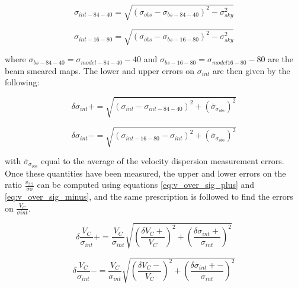 \documentclass[fleqn,usenatbib]{mn2e}
\begin{document}
\begin{equation}\label{eq:sig_84_40}
   \sigma_{int-84-40} = \sqrt{(\sigma_{obs} - \sigma_{bs-84-40})^{2} - \sigma_{sky}^{2}}
\end{equation}

\begin{equation}\label{eq:sig_16_80}
   \sigma_{int-16-80} = \sqrt{\left(\sigma_{obs} - \sigma_{bs-16-80}\right)^{2} - \sigma_{sky}^{2}}
\end{equation}

where $\sigma_{bs-84-40} = \sigma_{model-84-40} - 40$ and $\sigma_{bs-16-80} = \sigma_{model16-80} - 80$ are the beam smeared maps.
The lower and upper errors on $\sigma_{int}$ are then given by the following:

\begin{equation}\label{eq:sig_plus_error}
   \delta\sigma_{int}+ = \sqrt{\left(\sigma_{int} - \sigma_{int-84-40}\right)^{2} + \left(\bar{\sigma}_{\sigma_{obs}}\right)^{2}}
\end{equation}

\begin{equation}\label{eq:sig_minus_error}
   \delta\sigma_{int}- = \sqrt{\left(\sigma_{int-16-80} - \sigma_{int}\right)^{2} + \left(\bar{\sigma}_{\sigma_{obs}}\right)^{2}}
\end{equation}

with $\bar{\sigma}_{\sigma_{obs}}$ equal to the average of the velocity dispersion measurement errors.
Once these quantities have been measured, the upper and lower errors on the ratio $\frac{v_{2.2}}{\sigma{o}}$ can be computed using equations \ref{eq:v_over_sig_plus} and \ref{eq:v_over_sig_minus}, and the same prescription is followed to find the errors on $\frac{V_{C}}{\sigma{int}}$.

\begin{equation}\label{eq:v_over_sig_plus}
   \delta\frac{V_{C}}{\sigma_{int}}+ = \frac{V_{C}}{\sigma_{int}}\sqrt{\left(\frac{\delta V_{C}+}{V_{C}}\right)^{2} + \left(\frac{\delta\sigma_{int}+}{\sigma_{int}}\right)^{2}}
\end{equation}

\begin{equation}\label{eq:v_over_sig_minus}
   \delta\frac{V_{C}}{\sigma_{int}}- = \frac{V_{C}}{\sigma_{int}}\sqrt{\left(\frac{\delta V_{C}-}{V_{C}}\right)^{2} + \left(\frac{\delta\sigma_{int}+-}{\sigma_{int}}\right)^{2}}
\end{equation}


\bsp    %
\label{lastpage}
\end{document}
